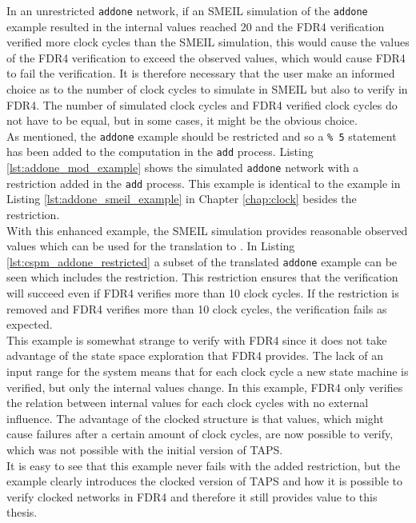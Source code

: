 In an unrestricted \texttt{addone} network, if an SMEIL simulation of the \texttt{addone} example resulted in the internal values reached 20 and the FDR4 verification verified more clock cycles than the SMEIL simulation, this would cause the values of the FDR4 verification to exceed the observed values, which would cause FDR4 to fail the verification. It is therefore necessary that the user make an informed choice as to the number of clock cycles to simulate in SMEIL but also to verify in FDR4. The number of simulated clock cycles and FDR4 verified clock cycles do not have to be equal, but in some cases, it might be the obvious choice. \\

As mentioned, the \texttt{addone} example should be restricted and so a \texttt{\% 5} statement has been added to the computation in the \texttt{add} process. Listing \ref{lst:addone_mod_example} shows the simulated \texttt{addone} network with a restriction added in the \texttt{add} process. This example is identical to the example in Listing \ref{lst:addone_smeil_example} in Chapter \ref{chap:clock} besides the restriction. \\

With this enhanced example, the SMEIL simulation provides reasonable observed values which can be used for the translation to \cspm{}. In Listing \ref{lst:cspm_addone_restricted} a subset of the translated \texttt{addone} example can be seen which includes the restriction.
This restriction ensures that the verification will succeed even if FDR4 verifies more than 10 clock cycles. If the restriction is removed and FDR4 verifies more than 10 clock cycles, the verification fails as expected. \\

This example is somewhat strange to verify with FDR4 since it does not take advantage of the state space exploration that FDR4 provides. The lack of an input range for the system means that for each clock cycle a new state machine is verified, but only the internal values change. In this example, FDR4 only verifies the relation between internal values for each clock cycles with no external influence. The advantage of the clocked structure is that values, which might cause failures after a certain amount of clock cycles, are now possible to verify, which was not possible with the initial version of TAPS. \\

It is easy to see that this example never fails with the added restriction, but the example clearly introduces the clocked version of TAPS and how it is possible to verify clocked networks in FDR4 and therefore it still provides value to this thesis.

